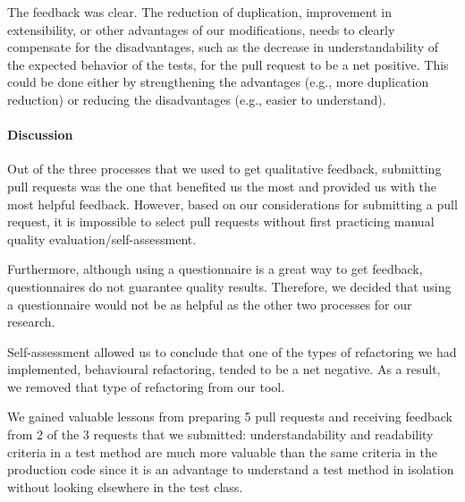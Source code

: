 The feedback was clear. The reduction of duplication, improvement in extensibility, or other advantages of our modifications, needs to clearly compensate for the disadvantages, such as the decrease in understandability of the expected behavior of the tests, for the pull request to be a net positive. This could be done either by strengthening the advantages (e.g., more duplication reduction) or reducing the disadvantages (e.g., easier to understand).



\paragraph{Discussion}
Out of the three processes that we used to get qualitative feedback, submitting pull requests was the one that benefited us the most and provided us with the most helpful feedback. However, based on our considerations for submitting a pull request, it is impossible to select pull requests without first practicing manual quality evaluation/self-assessment.

Furthermore, although using a questionnaire is a great way to get feedback, questionnaires do not guarantee quality results. Therefore, we decided that using a questionnaire would not be as helpful as the other two processes for our research.

Self-assessment allowed us to conclude that one of the types of refactoring we had implemented, behavioural refactoring, tended to be a net negative. As a result, we removed that type of refactoring from our tool.

We gained valuable lessons from preparing 5 pull requests and receiving feedback from 2 of the 3 requests that we submitted: understandability and readability criteria in a test method are much more valuable than the same criteria in the production code since it is an advantage to understand a test method in isolation without looking elsewhere in the test class. 

